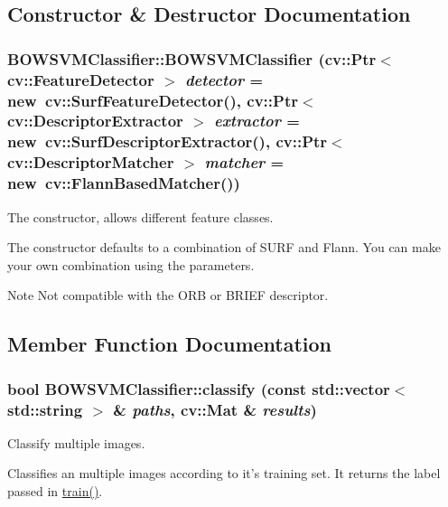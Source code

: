 \subsection{Constructor \& Destructor Documentation}
\hypertarget{classBOWSVMClassifier_a9de6c35238e76ca52c2ac01e71d08f16}{
\subsubsection[{BOWSVMClassifier}]{\setlength{\rightskip}{0pt plus 5cm}BOWSVMClassifier::BOWSVMClassifier (cv::Ptr$<$ cv::FeatureDetector $>$ {\em detector} = {\ttfamily new~cv::SurfFeatureDetector()}, \/  cv::Ptr$<$ cv::DescriptorExtractor $>$ {\em extractor} = {\ttfamily new~cv::SurfDescriptorExtractor()}, \/  cv::Ptr$<$ cv::DescriptorMatcher $>$ {\em matcher} = {\ttfamily new~cv::FlannBasedMatcher()})}}
\label{classBOWSVMClassifier_a9de6c35238e76ca52c2ac01e71d08f16}


The constructor, allows different feature classes. 

The constructor defaults to a combination of SURF and Flann. You can make your own combination using the parameters.

\begin{DoxyNote}{Note}
Not compatible with the ORB or BRIEF descriptor. 
\end{DoxyNote}


\subsection{Member Function Documentation}
\hypertarget{classBOWSVMClassifier_a77d77f5172e9665b3ef5154e52db9721}{
\subsubsection[{classify}]{\setlength{\rightskip}{0pt plus 5cm}bool BOWSVMClassifier::classify (const std::vector$<$ std::string $>$ \& {\em paths}, \/  cv::Mat \& {\em results})}}
\label{classBOWSVMClassifier_a77d77f5172e9665b3ef5154e52db9721}


Classify multiple images. 

Classifies an multiple images according to it's training set. It returns the label passed in \hyperlink{classBOWSVMClassifier_a95f08ba073d32d733aa79ae52113c147}{train()}.


